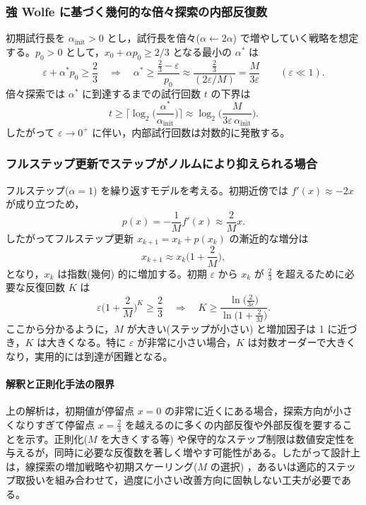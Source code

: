 \documentclass[a4paper, 10pt, dvipdfmx,draft]{article}
\begin{document}
\subsubsection*{強 Wolfe に基づく幾何的な倍々探索の内部反復数}
初期試行長を $\alpha_{\mathrm{init}}>0$ とし，試行長を倍々($\alpha\leftarrow2\alpha$) で増やしていく戦略を想定する。$p_0>0$ として，$x_0+\alpha p_0\ge 2/3$ となる最小の $\alpha^*$ は
\[
    \varepsilon + \alpha^* p_0 \ge \frac{2}{3}
    \quad\Longrightarrow\quad
    \alpha^* \ge \frac{\frac{2}{3}-\varepsilon}{p_0}
    \approx \frac{\frac{2}{3}}{(2\varepsilon/M)} = \frac{M}{3\varepsilon}\qquad(\varepsilon\ll1).
\]
倍々探索では $\alpha^*$ に到達するまでの試行回数 $t$ の下界は
\[
    t \ge \Big\lceil \log_2\!\Big(\frac{\alpha^*}{\alpha_{\mathrm{init}}}\Big)\Big\rceil
    \approx \log_2\!\Big(\frac{M}{3\varepsilon\,\alpha_{\mathrm{init}}}\Big).
\]
したがって $\varepsilon\to0^+$ に伴い，内部試行回数は対数的に発散する。

\subsubsection*{フルステップ更新でステップがノルムにより抑えられる場合}
フルステップ($\alpha=1$) を繰り返すモデルを考える。初期近傍では $f'(x)\approx -2x$ が成り立つため，
\[
    p(x)=-\frac{1}{M}f'(x)\approx \frac{2}{M}x.
\]
したがってフルステップ更新 $x_{k+1}=x_k+p(x_k)$ の漸近的な増分は
\[
    x_{k+1}\approx x_k\Big(1+\frac{2}{M}\Big),
\]
となり，$x_k$ は指数(幾何) 的に増加する。初期 $\varepsilon$ から $x_k$ が $\frac{2}{3}$ を超えるために必要な反復回数 $K$ は
\[
    \varepsilon\Big(1+\frac{2}{M}\Big)^K \ge \frac{2}{3}
    \quad\Longrightarrow\quad
    K \ge \frac{\ln\big(\frac{2}{3\varepsilon}\big)}{\ln\big(1+\frac{2}{M}\big)}.
\]
ここから分かるように，$M$ が大きい(ステップが小さい) と増加因子は 1 に近づき，$K$ は大きくなる。特に $\varepsilon$ が非常に小さい場合，$K$ は対数オーダーで大きくなり，実用的には到達が困難となる。

\paragraph{解釈と正則化手法の限界}
上の解析は，初期値が停留点 $x=0$ の非常に近くにある場合，探索方向が小さくなりすぎて停留点 $x=\frac{2}{3}$ を越えるのに多くの内部反復や外部反復を要することを示す。正則化($M$ を大きくする等) や保守的なステップ制限は数値安定性を与えるが，同時に必要な反復数を著しく増やす可能性がある。したがって設計上は，線探索の増加戦略や初期スケーリング($M$ の選択) ，あるいは適応的ステップ取扱いを組み合わせて，過度に小さい改善方向に固執しない工夫が必要である。
\end{document}
